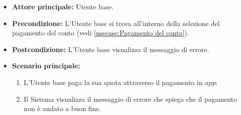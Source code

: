\label{usecase:Errore pagamento}
\begin{itemize}
	\item \textbf{Attore principale:} Utente base.

	\item \textbf{Precondizione:}
	      L'Utente base si trova all'interno della selezione del pagamento del conto (vedi \autoref{usecase:Pagamento del conto}).

	\item \textbf{Postcondizione:}
	      L'Utente base visualizza il messaggio di errore.

	\item \textbf{Scenario principale:}
	      \begin{enumerate}
		      \item L'Utente base paga la sua quota attraverso il pagamento in \textit{app};

		      \item Il Sistema visualizza il messaggio di errore che spiega che il pagamento non è andato a buon fine.
	      \end{enumerate}
\end{itemize}
